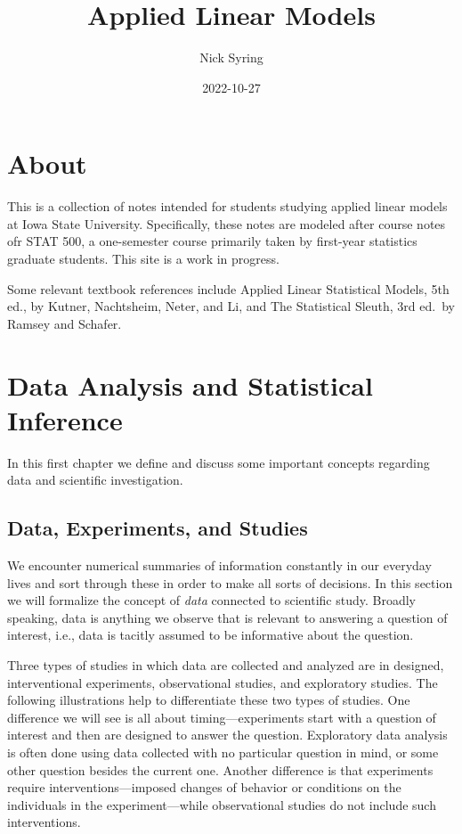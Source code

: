 \documentclass[
]{book}
\title{Applied Linear Models}
\author{Nick Syring}
\date{2022-10-27}
\begin{document}
\maketitle

{
\setcounter{tocdepth}{1}
\tableofcontents
}
\hypertarget{about}{%
\chapter{About}\label{about}}

This is a collection of notes intended for students studying applied linear models at Iowa State University. Specifically, these notes are modeled after course notes ofr STAT 500, a one-semester course primarily taken by first-year statistics graduate students. This site is a work in progress.

Some relevant textbook references include Applied Linear Statistical Models, 5th ed., by Kutner, Nachtsheim, Neter, and Li, and The Statistical Sleuth, 3rd ed.~by Ramsey and Schafer.

\hypertarget{data-analysis-and-statistical-inference}{%
\chapter{Data Analysis and Statistical Inference}\label{data-analysis-and-statistical-inference}}

In this first chapter we define and discuss some important concepts regarding data and scientific investigation.

\hypertarget{data-experiments-and-studies}{%
\section{Data, Experiments, and Studies}\label{data-experiments-and-studies}}

We encounter numerical summaries of information constantly in our everyday lives and sort through these in order to make all sorts of decisions. In this section we will formalize the concept of \emph{data} connected to scientific study. Broadly speaking, data is anything we observe that is relevant to answering a question of interest, i.e., data is tacitly assumed to be informative about the question.

Three types of studies in which data are collected and analyzed are in designed, interventional experiments, observational studies, and exploratory studies. The following illustrations help to differentiate these two types of studies. One difference we will see is all about timing---experiments start with a question of interest and then are designed to answer the question. Exploratory data analysis is often done using data collected with no particular question in mind, or some other question besides the current one. Another difference is that experiments require interventions---imposed changes of behavior or conditions on the individuals in the experiment---while observational studies do not include such interventions.
\end{document}
